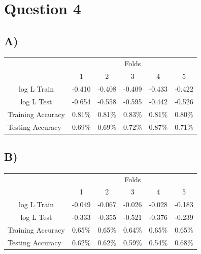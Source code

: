 \documentclass{report}
\begin{document}
\newpage
\section*{Question 4}
\subsection*{A)}
\begin{center}
\begin{table}[h]
 \begin{tabular}{l|c|c|c|c|c|}
 \cline{2-6}
     & \multicolumn{5}{c|}{Folds}      \\ \cline{2-6}
     &  1  &  2  &  3  &  4  &  5 \\ \hline
\multicolumn{1}{|c|}{log L Train} & -0.410 & -0.408 & -0.409 & -0.433 & -0.422  \\ \hline
\multicolumn{1}{|c|}{log L Test} & -0.654 & -0.558 & -0.595 & -0.442 & -0.526  \\ \hline
\multicolumn{1}{|l|}{Training Accuracy} & 0.81\% & 0.81\% & 0.83\% & 0.81\% & 0.80\% \\ \hline
\multicolumn{1}{|l|}{Testing Accuracy} & 0.69\% & 0.69\% & 0.72\% & 0.87\% & 0.71\% \\ \hline
\end{tabular}
\end{table}
\end{center}


\subsection*{B)}
\begin{table}[h]
 \begin{tabular}{l|c|c|c|c|c|}
 \cline{2-6}
     & \multicolumn{5}{c|}{Folds}      \\ \cline{2-6}
     &  1  &  2  &  3  &  4  &  5 \\ \hline
\multicolumn{1}{|c|}{log L Train} & -0.049 & -0.067 & -0.026 & -0.028 & -0.183  \\ \hline
\multicolumn{1}{|c|}{log L Test} & -0.333 & -0.355 & -0.521 & -0.376 & -0.239  \\ \hline
\multicolumn{1}{|l|}{Training Accuracy} & 0.65\% & 0.65\% & 0.64\% & 0.65\% & 0.65\% \\ \hline
\multicolumn{1}{|l|}{Testing Accuracy} & 0.62\% & 0.62\% & 0.59\% & 0.54\% & 0.68\% \\ \hline
\end{tabular}
\end{table}
\end{document}
